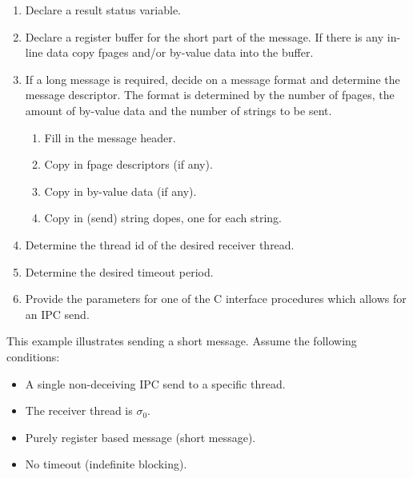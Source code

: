 \begin{enumerate}

\item Declare a result status variable.

\item Declare a register buffer for the short part of the message. If
  there is any in-line data copy fpages and/or by-value data into the
  buffer.

\item If a long message is required, decide on a message format and
  determine the message descriptor. The format is determined by the
  number of fpages, the amount of by-value data and the number of
  strings to be sent.

  \begin{enumerate}

  \item Fill in the message header.
                
  \item Copy in fpage descriptors (if any).
        
  \item Copy in by-value data (if any).

  \item Copy in (send) string dopes, one for each string.

  \end{enumerate} 

\item Determine the thread id of the desired receiver thread.

\item Determine the desired timeout period.

\item Provide the parameters for one of the C interface procedures
  which allows for an IPC send.

\end{enumerate}


This example illustrates sending a short message. Assume the following
conditions:

\begin{itemize}

\item A single non-deceiving IPC send to a specific thread.
\item The receiver thread is $\sigma_0$.
\item Purely register based message (short message).
\item No timeout (indefinite blocking).

\end{itemize}

